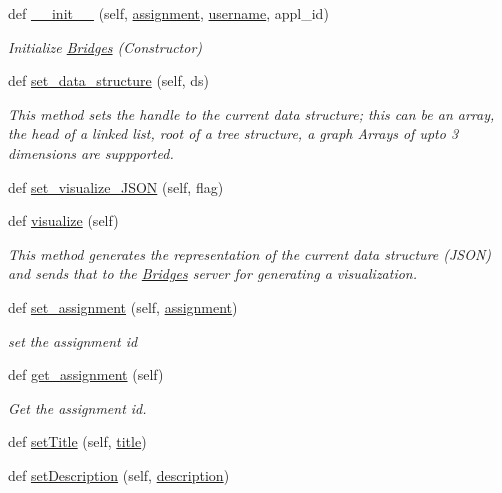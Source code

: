 \begin{DoxyCompactItemize}
\item 
def \hyperlink{class_bridges_1_1_bridges_1_1_bridges_ada234978079456870bf2212eaa1be938}{\+\_\+\+\_\+init\+\_\+\+\_\+} (self, \hyperlink{class_bridges_1_1_bridges_1_1_bridges_ac0e73586c3543580d1b2628145f045ac}{assignment}, \hyperlink{class_bridges_1_1_bridges_1_1_bridges_a4b2e284c3e910633af57a02fe73cc714}{username}, appl\+\_\+id)
\begin{DoxyCompactList}\small\item\em Initialize \hyperlink{class_bridges_1_1_bridges_1_1_bridges}{Bridges} (Constructor) \end{DoxyCompactList}\item 
def \hyperlink{class_bridges_1_1_bridges_1_1_bridges_a2eb292b292544a6d8ff6bb336580f133}{set\+\_\+data\+\_\+structure} (self, ds)
\begin{DoxyCompactList}\small\item\em This method sets the handle to the current data structure; this can be an array, the head of a linked list, root of a tree structure, a graph Arrays of upto 3 dimensions are suppported. \end{DoxyCompactList}\item 
def \hyperlink{class_bridges_1_1_bridges_1_1_bridges_ab7fb96498ecd5ae918ff9d1a8b345940}{set\+\_\+visualize\+\_\+\+J\+S\+O\+N} (self, flag)
\item 
def \hyperlink{class_bridges_1_1_bridges_1_1_bridges_a7503d1902eee682a0661271c070978c1}{visualize} (self)
\begin{DoxyCompactList}\small\item\em This method generates the representation of the current data structure (J\+S\+O\+N) and sends that to the \hyperlink{class_bridges_1_1_bridges_1_1_bridges}{Bridges} server for generating a visualization. \end{DoxyCompactList}\item 
def \hyperlink{class_bridges_1_1_bridges_1_1_bridges_aee298de8362388c9aa7d4b95f16199d7}{set\+\_\+assignment} (self, \hyperlink{class_bridges_1_1_bridges_1_1_bridges_ac0e73586c3543580d1b2628145f045ac}{assignment})
\begin{DoxyCompactList}\small\item\em set the assignment id \end{DoxyCompactList}\item 
def \hyperlink{class_bridges_1_1_bridges_1_1_bridges_a3c127f51ab4a4243c8a4893fa358f72f}{get\+\_\+assignment} (self)
\begin{DoxyCompactList}\small\item\em Get the assignment id. \end{DoxyCompactList}\item 
def \hyperlink{class_bridges_1_1_bridges_1_1_bridges_ab72d30d944cb57f8a5343143cc030dc2}{set\+Title} (self, \hyperlink{class_bridges_1_1_bridges_1_1_bridges_ad02d0b0bcd679a3d7dd2dd2736b8aa58}{title})
\item 
def \hyperlink{class_bridges_1_1_bridges_1_1_bridges_aa0a396dc490f1626608d9538822af1c1}{set\+Description} (self, \hyperlink{class_bridges_1_1_bridges_1_1_bridges_ad5ec1f7917cbe6321273b4a22a1bab50}{description})
\end{DoxyCompactItemize}
